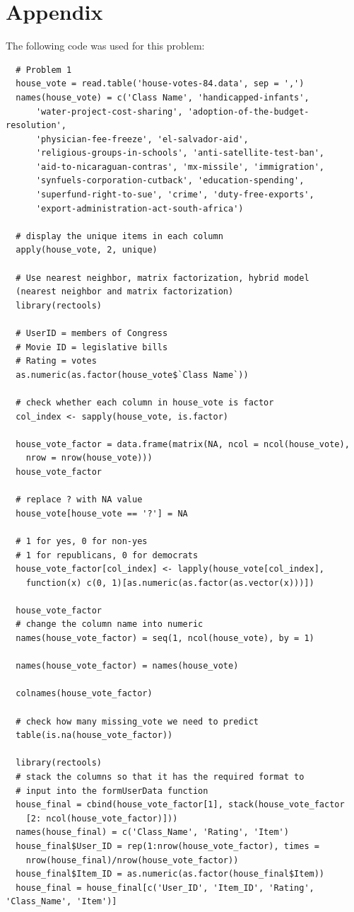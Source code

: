 \documentclass{article}
\begin{document}
\section{Appendix}
The following code was used for this problem:
\begin{verbatim}
  # Problem 1
  house_vote = read.table('house-votes-84.data', sep = ',')
  names(house_vote) = c('Class Name', 'handicapped-infants', 
      'water-project-cost-sharing', 'adoption-of-the-budget-resolution',
      'physician-fee-freeze', 'el-salvador-aid', 
      'religious-groups-in-schools', 'anti-satellite-test-ban',
      'aid-to-nicaraguan-contras', 'mx-missile', 'immigration', 
      'synfuels-corporation-cutback', 'education-spending', 
      'superfund-right-to-sue', 'crime', 'duty-free-exports', 
      'export-administration-act-south-africa')

  # display the unique items in each column
  apply(house_vote, 2, unique)

  # Use nearest neighbor, matrix factorization, hybrid model 
  (nearest neighbor and matrix factorization)
  library(rectools)

  # UserID = members of Congress
  # Movie ID = legislative bills 
  # Rating = votes
  as.numeric(as.factor(house_vote$`Class Name`))

  # check whether each column in house_vote is factor
  col_index <- sapply(house_vote, is.factor)

  house_vote_factor = data.frame(matrix(NA, ncol = ncol(house_vote), 
    nrow = nrow(house_vote)))
  house_vote_factor

  # replace ? with NA value
  house_vote[house_vote == '?'] = NA

  # 1 for yes, 0 for non-yes
  # 1 for republicans, 0 for democrats
  house_vote_factor[col_index] <- lapply(house_vote[col_index], 
    function(x) c(0, 1)[as.numeric(as.factor(as.vector(x)))])

  house_vote_factor
  # change the column name into numeric
  names(house_vote_factor) = seq(1, ncol(house_vote), by = 1)

  names(house_vote_factor) = names(house_vote)

  colnames(house_vote_factor)

  # check how many missing_vote we need to predict
  table(is.na(house_vote_factor))

  library(rectools)
  # stack the columns so that it has the required format to 
  # input into the formUserData function
  house_final = cbind(house_vote_factor[1], stack(house_vote_factor
    [2: ncol(house_vote_factor)]))
  names(house_final) = c('Class_Name', 'Rating', 'Item')
  house_final$User_ID = rep(1:nrow(house_vote_factor), times = 
    nrow(house_final)/nrow(house_vote_factor))
  house_final$Item_ID = as.numeric(as.factor(house_final$Item))
  house_final = house_final[c('User_ID', 'Item_ID', 'Rating', 'Class_Name', 'Item')]


\end{verbatim}
\end{document}
